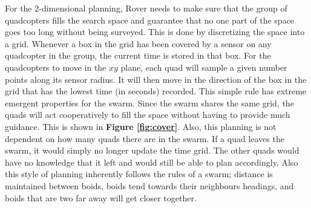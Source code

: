 \documentclass[12pt]{article}
\newcommand{\fig}[1]{\textbf{Figure \ref{fig:#1}}}
\begin{document}
For the 2-dimensional planning, Rover needs to make sure that the group of
quadcopters fills the search space and guarantee that no one part of the space
goes too long without being surveyed. This is done by discretizing the space
into a grid. Whenever a box in the grid has been covered by a sensor on any
quadcopter in the group, the current time is stored in that box.  For the
quadcopters to move in the $xy$ plane, each quad will sample a given number
points along its sensor radius. It will then move in the direction of the box
in the grid that has the lowest time (in seconds) recorded. This simple rule
has extreme emergent properties for the swarm. Since the swarm shares the same
grid, the quads will act cooperatively to fill the space without having to
provide much guidance. This is shown in \fig{cover}. Also, this planning is not
dependent on how many quads there are in the swarm. If a quad leaves the swarm,
it would simply no longer update the time grid. The other quads would have no
knowledge that it left and would still be able to plan accordingly. Also this
style of planning inherently follows the rules of a swarm; distance is
maintained between boids, boids tend towards their neighbours headings, and
boids that are two far away will get closer together.
\end{document}
